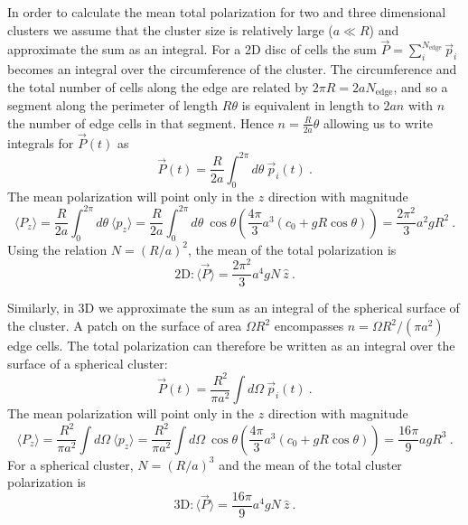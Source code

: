 In order to calculate the mean total polarization for two and three dimensional clusters we assume that the cluster size is relatively large ($a\ll R$) and approximate the sum as an integral. For a 2D disc of cells the sum
$\vec{P} = \sum_i^{N_\text{edge}} \vec{p}_i$
becomes an integral over the circumference of the cluster. The circumference and the total number of cells along the edge are related by $2\pi R = 2a N_\text{edge}$, and so a segment along the perimeter of length $R\theta$ is equivalent in length to $2a n$ with $n$ the number of edge cells in that segment. Hence $n =\frac{R}{2a}\theta$ allowing us to write integrals for $\vec{P}(t)$ as
\begin{equation}
    \vec{P}(t) = \frac{R}{2a} \int_0^{2\pi} d\theta \ \vec{p}_i(t) \ .
\end{equation}
The mean polarization will point only in the $z$ direction with magnitude
\begin{equation*}
    \langle P_z \rangle = \frac{R}{2a} \int_0^{2\pi} d\theta \ \langle p_z \rangle = \frac{R}{2a} \int_0^{2\pi} d\theta \ \cos\theta \left( \frac{4\pi}{3}a^3 (c_0+gR\cos\theta) \right) = \frac{2\pi^2}{3} a^2gR^2 \ .
\end{equation*}
Using the relation $N = (R/a)^2$, the mean of the total polarization is
\begin{equation} \label{eq:2DECmean}
    \text{2D}: \langle\vec{P}\rangle = \frac{2\pi^2}{3} a^4gN \ \hat{z} \ .
\end{equation}

Similarly, in 3D we approximate the sum as an integral of the spherical surface of the cluster. A patch on the surface of area $\Omega R^2$ encompasses
$n = \Omega R^2 / (\pi a^2)$ edge cells. The total polarization can therefore be written as an integral over the surface of a spherical cluster:
\begin{equation}
    \vec{P}(t) = \frac{R^2}{\pi a^2} \int d\Omega \ \vec{p}_i(t) \ .
\end{equation}
The mean polarization will point only in the $z$ direction with magnitude
\begin{equation*}
    \langle P_z \rangle = \frac{R^2}{\pi a^2} \int d\Omega \ \langle p_z \rangle = \frac{R^2}{\pi a^2} \int d\Omega \ \cos\theta \left( \frac{4\pi}{3}a^3 (c_0+gR\cos\theta) \right) = \frac{16\pi}{9} agR^3 \ .
\end{equation*}
For a spherical cluster, $N = (R/a)^3$ and the mean of the total cluster polarization is
\begin{equation} \label{eq:3DECmean}
    \text{3D}: \langle\vec{P}\rangle = \frac{16\pi}{9} a^4gN \ \hat{z} \ .
\end{equation}



